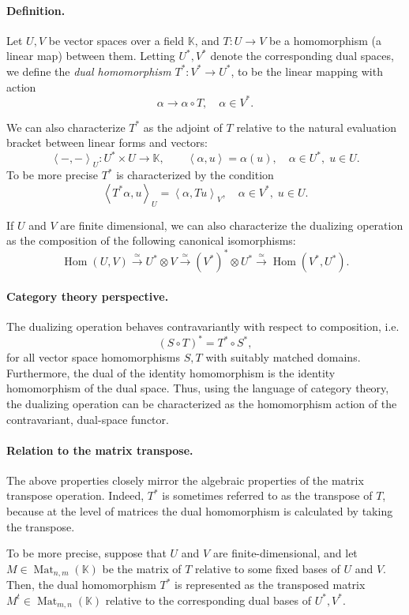 \documentclass[12pt]{article}
\newcommand{\Hom}{\mathop{\mathrm{Hom}}\nolimits}
\newcommand{\Mat}{\mathop{\mathrm{Mat}}\nolimits}
\newcommand{\kfield}{\mathbb{K}}
\newcommand{\supt}{^t}
\newcommand{\dual}{^*}
\begin{document}
\paragraph{Definition.}  Let $U,V$ be vector spaces over a field
$\kfield$, and  $T:U\rightarrow V$ be a homomorphism (a
linear map) between them.
Letting $U\dual, V\dual$  denote the corresponding dual
spaces, we define the {\em dual homomorphism} 
$T\dual:V\dual\rightarrow U\dual$,
to be the linear mapping with action
$$\alpha \to \alpha\circ T,\quad \alpha\in V^*.$$

We can also characterize  $T^*$ as the adjoint of $T$ relative
to the natural evaluation bracket between linear forms and vectors:
$$\left<-,-\right>_U: U\dual\times U\rightarrow \kfield,\qquad
\left<\alpha,u\right> = \alpha(u),\quad \alpha\in U\dual,\; u\in U.$$
To be more precise $T\dual$ is characterized by the condition 
$$\left<T^*\alpha,u\right>_U = \left< \alpha,Tu\right>_V ,\quad \alpha\in
V\dual,\; u\in U.$$

If $U$ and $V$ are finite dimensional, we can also characterize the
dualizing operation as the composition of the following canonical
isomorphisms:
$$\Hom(U,V)
\stackrel{\simeq}{\longrightarrow}
U\dual\otimes V
\stackrel{\simeq}{\longrightarrow}
(V^*)^*\otimes U^*
\stackrel{\simeq}{\longrightarrow}
\Hom(V^*,U^*).
$$

\paragraph{Category theory perspective.} The dualizing operation behaves
contravariantly with respect to composition, i.e.
$$(S\circ T)^* = T\dual \circ S\dual,$$
for all vector space homomorphisms $S,
T$ with suitably matched domains.  Furthermore, the dual of the
identity homomorphism is the identity homomorphism of the dual space.
Thus, using the language of category theory, the dualizing operation
can be characterized as the homomorphism action of the contravariant,
dual-space functor.

\paragraph{Relation to the matrix transpose.} The above properties closely
mirror the algebraic properties of the matrix transpose operation.
Indeed, $T^*$ is sometimes referred to as the transpose of $T$,
because at the level of matrices the dual homomorphism is calculated
by taking the transpose.  

To be more precise, suppose that $U$ and $V$ are finite-dimensional,
and let $M\in \Mat_{n,m}(\kfield)$ be the matrix of $T$ relative to
some fixed bases of $U$ and $V$. Then, the dual homomorphism $T\dual$
is represented as the transposed matrix $M\supt\in\Mat_{m,n}(\kfield)$
relative to the corresponding dual bases of $U\dual, V\dual$.


\end{document}
